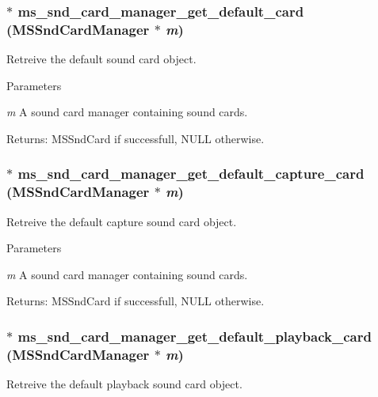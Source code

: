 \subsubsection[{ms\_\-snd\_\-card\_\-manager\_\-get\_\-default\_\-card}]{$\ast$ ms\_\-snd\_\-card\_\-manager\_\-get\_\-default\_\-card ({\bf MSSndCardManager} $\ast$ {\em m})}\label{group__mediastreamer2__soundcardmanager_gadcfd4ca5ae0c67935cef202afb3efdaa}
Retreive the default sound card object.


\begin{DoxyParams}{Parameters}
\item[{\em m}]A sound card manager containing sound cards.\end{DoxyParams}
Returns: MSSndCard if successfull, NULL otherwise. 
\subsubsection[{ms\_\-snd\_\-card\_\-manager\_\-get\_\-default\_\-capture\_\-card}]{$\ast$ ms\_\-snd\_\-card\_\-manager\_\-get\_\-default\_\-capture\_\-card ({\bf MSSndCardManager} $\ast$ {\em m})}\label{group__mediastreamer2__soundcardmanager_gaa78dc16cef612442727a1bff3584b5d7}
Retreive the default capture sound card object.


\begin{DoxyParams}{Parameters}
\item[{\em m}]A sound card manager containing sound cards.\end{DoxyParams}
Returns: MSSndCard if successfull, NULL otherwise. 
\subsubsection[{ms\_\-snd\_\-card\_\-manager\_\-get\_\-default\_\-playback\_\-card}]{$\ast$ ms\_\-snd\_\-card\_\-manager\_\-get\_\-default\_\-playback\_\-card ({\bf MSSndCardManager} $\ast$ {\em m})}\label{group__mediastreamer2__soundcardmanager_gac0e9f66b3bd286d68c0b31df32475255}
Retreive the default playback sound card object.


